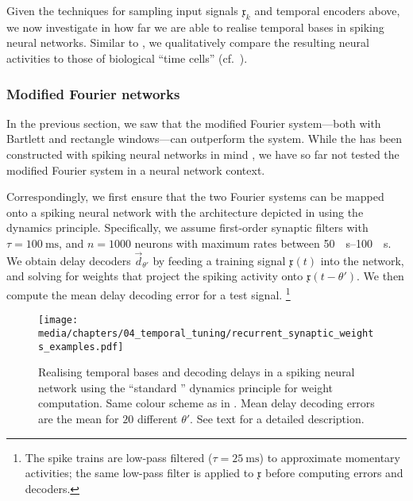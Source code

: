 Given the techniques for sampling input signals $\mathfrak{x}_k$ and temporal encoders above, we now investigate in how far we are able to realise temporal bases in spiking neural networks.
Similar to \citet{voelker2018improving}, we qualitatively compare the resulting neural activities to those of biological \enquote{time cells} (cf.~).

\subsubsection{Modified Fourier networks}
In the previous section, we saw that the modified Fourier system---both with Bartlett and rectangle windows---can outperform the \LDN system.
While the \LDN has been constructed with spiking neural networks in mind \citep{voelker2018improving}, we have so far not tested the modified Fourier system in a neural network context.

Correspondingly, we first ensure that the two Fourier systems can be mapped onto a spiking neural network with the architecture depicted in  using the \NEF dynamics principle.
Specifically, we assume first-order synaptic filters with $\tau = \SI{100}{\milli\second}$, and $n = 1000$ \LIF neurons with maximum rates between \SIrange{50}{100}{\per\second}.
We obtain delay decoders $\vec d_{\theta'}$ by feeding a training signal $\mathfrak{x}(t)$ into the network, and solving for weights that project the spiking activity onto $\mathfrak{x}(t - \theta')$.
We then compute the mean delay decoding error for a test signal.%
\footnote{
The spike trains are low-pass filtered ($\tau = \SI{25}{\milli\second}$) to approximate momentary activities; the same low-pass filter is applied to $\mathfrak{x}$ before computing errors and decoders.
}
\begin{figure}
	\centering
	\texttt{[image: media/chapters/04\_temporal\_tuning/recurrent\_synaptic\_weights\_examples.pdf]}
	\caption[Realising temporal bases and decoding delays in a spiking neural network]{
	Realising temporal bases and decoding delays in a spiking neural network using the \enquote{standard \NEF} dynamics principle for weight computation.
	Same colour scheme as in .
	Mean delay decoding errors are the mean \NRMSE for $20$ different $\theta'$. See text for a detailed description.
	}
	\label{fig:recurrent_synaptic_weights_examples}
\end{figure}

